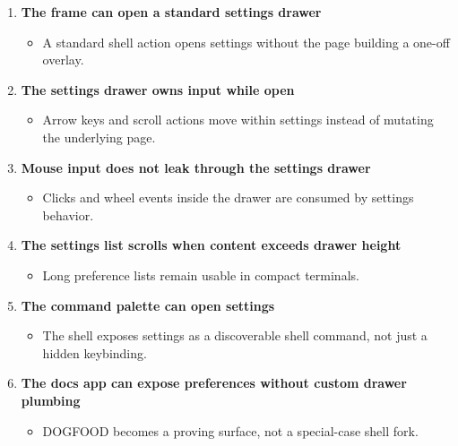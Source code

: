 \begin{enumerate}
\def\labelenumi{\arabic{enumi}.}
\tightlist
\item
  \textbf{The frame can open a standard settings drawer}

  \begin{itemize}
  \tightlist
  \item
    A standard shell action opens settings without the page building a one-off overlay.
  \end{itemize}
\item
  \textbf{The settings drawer owns input while open}

  \begin{itemize}
  \tightlist
  \item
    Arrow keys and scroll actions move within settings instead of mutating the underlying page.
  \end{itemize}
\item
  \textbf{Mouse input does not leak through the settings drawer}

  \begin{itemize}
  \tightlist
  \item
    Clicks and wheel events inside the drawer are consumed by settings behavior.
  \end{itemize}
\item
  \textbf{The settings list scrolls when content exceeds drawer height}

  \begin{itemize}
  \tightlist
  \item
    Long preference lists remain usable in compact terminals.
  \end{itemize}
\item
  \textbf{The command palette can open settings}

  \begin{itemize}
  \tightlist
  \item
    The shell exposes settings as a discoverable shell command, not just a hidden keybinding.
  \end{itemize}
\item
  \textbf{The docs app can expose preferences without custom drawer plumbing}

  \begin{itemize}
  \tightlist
  \item
    DOGFOOD becomes a proving surface, not a special-case shell fork.
  \end{itemize}
\end{enumerate}

